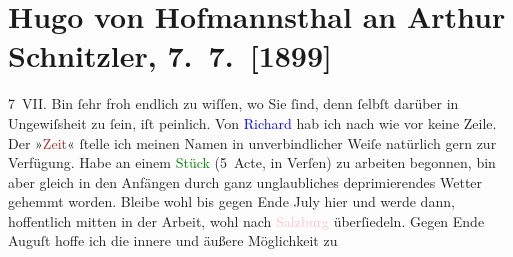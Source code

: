 

               \section[Hugo von Hofmannsthal an Arthur Schnitzler, 7. 7. {[}1899{]}]{ Hugo von Hofmannsthal an Arthur Schnitzler, 7. 7. {[}1899{]}}\nopagebreak{}\rehead{ }\normalsize\beginnumbering{} \toendnotes[C]{\smallbreak\pagebreak[2]} 
\toendnotes[C]{\smallbreak}\pstart
           \raggedleft{}{\pb}7 VII.\pend
           \pstart
           Bin ſehr froh endlich zu wiſſen, wo Sie ſind, denn ſelbſt darüber in Ungewiſsheit
                    zu ſein, iſt peinlich. Von \textcolor{blue}{Richard}{}\ledrightnote{\textcolor{blue}{Richard Beer-Hofmann}} hab ich
                    nach wie vor keine Zeile.\pend
           \pstart
           Der »\textcolor{brown}{Zeit}{}\ledrightnote{\textcolor{brown}{Die Zeit. Wiener Wochenschrift}}« ſtelle ich meinen Namen in
                    unverbindlicher Weiſe natürlich gern zur Verfügung. Habe an einem \textcolor{green}{Stück}{} (5 Acte, in Verſen) {\pb}zu arbeiten begonnen, bin
                    aber gleich in den Anfängen durch ganz unglaubliches deprimierendes Wetter
                    gehemmt worden.\pend
           \pstart
           Bleibe wohl bis gegen Ende July hier und werde dann, hoffentlich
                    mitten in der Arbeit, wohl nach \textcolor{pink}{Salzburg}{}\ledrightnote{\textcolor{pink}{Salzburg}}
                    überſiedeln. Gegen Ende Auguſt hoffe ich die innere {\pb}und äußere Möglichkeit zu
